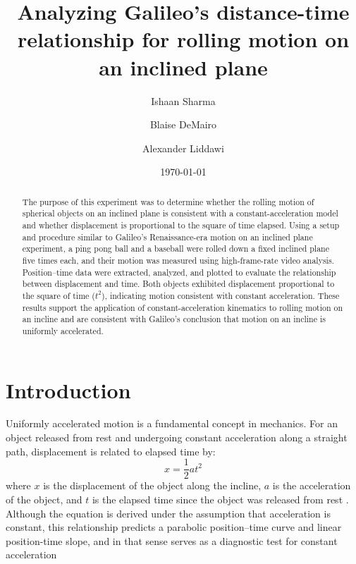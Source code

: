 \documentclass[reprint,amsmath,amssymb,aps,twoside]{revtex4-2}
\begin{document}
\setcounter{page}{38}

\title{Analyzing Galileo’s distance-time relationship for rolling motion on an inclined plane}
\author{Ishaan Sharma}
\author{Blaise DeMairo}
\author{Alexander Liddawi}
\date{\today}

\begin{abstract}
The purpose of this experiment was to determine whether the rolling motion of spherical objects on an inclined plane is consistent with a constant-acceleration model and whether displacement is proportional to the square of time elapsed. Using a setup and procedure similar to Galileo’s Renaissance-era motion on an inclined plane experiment, a ping pong ball and a baseball were rolled down a fixed inclined plane five times each, and their motion was measured using high-frame-rate video analysis. Position–time data were extracted, analyzed, and plotted to evaluate the relationship between displacement and time. Both objects exhibited displacement proportional to the square of time ($t^2$), indicating motion consistent with constant acceleration. These results support the application of constant-acceleration kinematics to rolling motion on an incline and are consistent with Galileo’s conclusion that motion on an incline is uniformly accelerated.
\end{abstract}


\maketitle\thispagestyle{mytitlepage}




\section{Introduction}
Uniformly accelerated motion is a fundamental concept in mechanics. For an object released from rest and undergoing constant acceleration along a straight path, displacement is related to elapsed time by:
\begin{equation}
x = \frac{1}{2} a t^2
\label{eq:1}
\end{equation}
where $x$ is the displacement of the object along the incline, $a$ is the acceleration of the object, and $t$ is the elapsed time since the object was released from rest \cite{tipler, openstax, barrons}. Although the equation is derived under the assumption that acceleration is constant, this relationship predicts a parabolic position–time curve and linear position-time slope, and in that sense serves as a diagnostic test for constant acceleration
\end{document}
